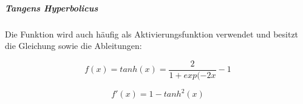 \subparagraph{Tangens Hyperbolicus}

Die Funktion wird auch häufig als Aktivierungsfunktion verwendet und besitzt die Gleichung sowie die Ableitungen: 

\begin{equation}
f(x) = tanh(x) = \frac{2}{1+exp(-2x}-1
\end{equation}

\begin{equation}
f'(x) = 1 - tanh^2(x)
\end{equation}

